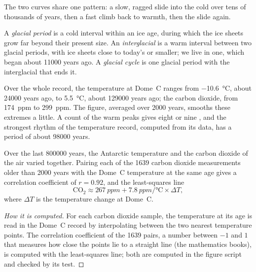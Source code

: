 The two curves share one pattern: a slow, ragged slide into the cold over
tens of thousands of years, then a fast climb back to warmth, then the
slide again.

\begin{definition}\label{def:g12:past-climates:glacial-cycle}
A \emph{glacial period} is a cold interval within an
ice age, during which the ice sheets grow far beyond their present size. An
\emph{interglacial} is a warm interval between two
glacial periods, with ice sheets close to today's or smaller; we live in one,
which began about \num{11000} years ago. A \emph{glacial
cycle} is one glacial period with the interglacial that
ends it.
\end{definition}

Over the whole record, the temperature at Dome~C ranges from
\qty{-10.6}{\degreeCelsius}, about \num{24000} years ago, to
\qty{+5.5}{\degreeCelsius}, about \num{129000} years ago; the carbon dioxide,
from \qty{174}{ppm} to \qty{299}{ppm}. The figure, averaged over \num{2000}
years, smooths these extremes a little. A count of the warm peaks gives eight
or nine , and the strongest rhythm of the temperature record,
computed from its data, has a period of about \num{98000} years.

\begin{proposition}\label{prop:g12:past-climates:correlation}
Over the last \num{800000} years, the Antarctic temperature and the carbon
dioxide of the air varied together. Pairing each of the 1639 carbon dioxide
measurements older than \num{2000} years with the Dome~C temperature at the
same age gives a correlation coefficient of $r = 0.92$, and the
least-squares line
\[
  \mathrm{CO_2} \approx \qty{267}{ppm} + \qty{7.8}{ppm/\degreeCelsius} \times \Delta T ,
\]
where $\Delta T$ is the temperature change at Dome~C.
\end{proposition}

\begin{proof}[How it is computed]
For each carbon dioxide sample, the temperature at its age is read in the
Dome~C record by interpolating between the two nearest temperature points.
The correlation coefficient of the 1639 pairs, a number between $-1$ and $1$
that measures how close the points lie to a straight line (the mathematics
books), is computed with the least-squares line; both are computed in the
figure script and checked by its test.
\end{proof}

